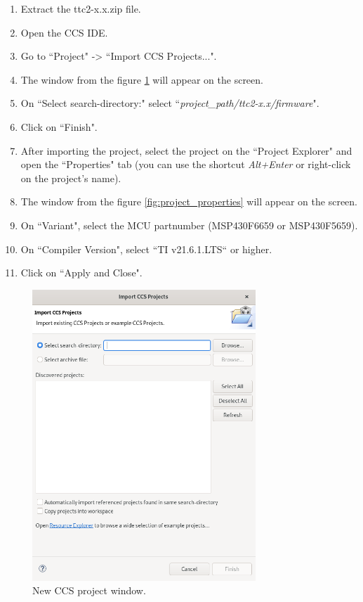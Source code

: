 \begin{enumerate}
    \item Extract the ttc2-x.x.zip file.  
    \item Open the CCS IDE.
    \item Go to ``Project" -> ``Import CCS Projects...".
    \item The window from the figure \ref{fig:compiling-tutorial} will appear on the screen.
    \item On ``Select search-directory:" select ``\textit{project\_path/ttc2-x.x/firmware}".
    \item Click on ``Finish".
    
    \item After importing the project, select the project on the ``Project Explorer" and open the ``Properties" tab (you can use the shortcut \textit{Alt+Enter} or right-click on the project's name). 
    \item The window from the figure \ref{fig:project_properties} will appear on the screen.
    \item On ``Variant", select the MCU partnumber (MSP430F6659 or MSP430F5659).
    \item On ``Compiler Version", select ``TI v21.6.1.LTS`` or higher.
    \item Click on ``Apply and Close".
\end{enumerate}

\begin{figure}[!h]
	\begin{center}
		\includegraphics[width=0.75\textwidth]{figures/ccs_project.png}
		\caption{New CCS project window.}
		\label{fig:compiling-tutorial}
	\end{center}
\end{figure}

